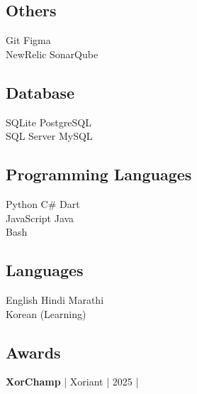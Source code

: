 \documentclass[]{deedy-resume-reversed}
\begin{document}
\begin{minipage}[t]{0.33\textwidth}
\subsection{Others}
Git \textbullet Figma \\
NewRelic \textbullet SonarQube \\
\sectionsep

\subsection{Database}
SQLite \textbullet PostgreSQL \\
SQL Server \textbullet MySQL \\
\sectionsep

\subsection{Programming Languages}
Python \textbullet{} C\# \textbullet{} Dart \\
JavaScript \textbullet{} Java \\
Bash
\sectionsep

\subsection{Languages}
English \textbullet{} Hindi \textbullet{} Marathi \\
Korean (Learning) 
\sectionsep

\subsection{Awards}
\textbf{XorChamp} | Xoriant | 2025  | 
\href{https://github.com/sunnydodti/resume/blob/main/awards/XorChamp%20-%20Sunny%20Dodti.pdf}{\faExternalLink } 
\sectionsep

\end{minipage}
\end{document}
